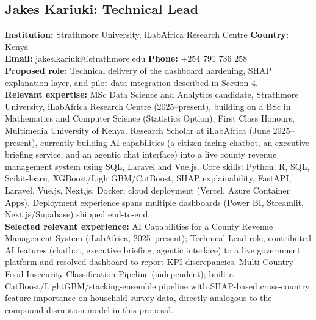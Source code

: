 \documentclass[12pt,a4paper]{article}
\begin{document}
\subsection*{Jakes Kariuki: Technical Lead}
\textbf{Institution:} Strathmore University, iLabAfrica Research Centre \quad \textbf{Country:} Kenya \\
\textbf{Email:} jakes.kariuki@strathmore.edu \quad \textbf{Phone:} +254 791 736 258 \\
\textbf{Proposed role:} Technical delivery of the dashboard hardening, SHAP explanation layer, and pilot-data integration described in Section 4. \\
\textbf{Relevant expertise:} MSc Data Science and Analytics candidate, Strathmore University, iLabAfrica Research Centre (2025--present), building on a BSc in Mathematics and Computer Science (Statistics Option), First Class Honours, Multimedia University of Kenya. Research Scholar at iLabAfrica (June 2025--present), currently building AI capabilities (a citizen-facing chatbot, an executive briefing service, and an agentic chat interface) into a live county revenue management system using SQL, Laravel and Vue.js. Core skills: Python, R, SQL, Scikit-learn, XGBoost/LightGBM/CatBoost, SHAP explainability, FastAPI, Laravel, Vue.js, Next.js, Docker, cloud deployment (Vercel, Azure Container Apps). Deployment experience spans multiple dashboards (Power BI, Streamlit, Next.js/Supabase) shipped end-to-end. \\
\textbf{Selected relevant experience:} AI Capabilities for a County Revenue Management System (iLabAfrica, 2025--present); Technical Lead role, contributed AI features (chatbot, executive briefing, agentic interface) to a live government platform and resolved dashboard-to-report KPI discrepancies. Multi-Country Food Insecurity Classification Pipeline (independent); built a CatBoost/LightGBM/stacking-ensemble pipeline with SHAP-based cross-country feature importance on household survey data, directly analogous to the compound-disruption model in this proposal.
\end{document}
